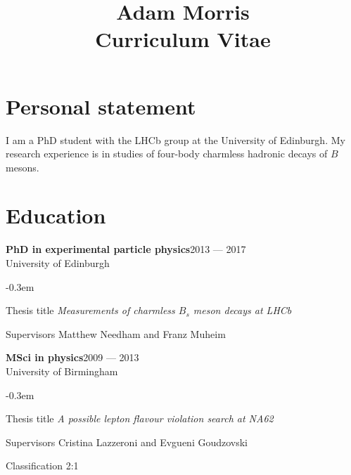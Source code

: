 \documentclass{simplecv}
\title{Adam Morris\\{\large Curriculum Vitae}}
\newcommand\dateditem[2]{#1\hfill#2\\}
\newcommand\topictitle[3]{\dateditem{{\textbf{#1}}}{#3}#2}
\def\typeface{phv}
\begin{document}
	\maketitle
	\fontfamily{\typeface}\selectfont
	\section{Personal statement}
	I am a PhD student with the LHCb group at the University of Edinburgh.
	My research experience is in studies of four-body charmless hadronic decays of $B$ mesons.
	\section{Education}
	\topictitle{PhD in experimental particle physics}{University of Edinburgh}{2013 --- 2017}
	\begin{topic}
		\itemsep-0.3em
		\item[Thesis title]{\textit{Measurements of charmless $B_s$ meson decays at LHCb}}
		\item[Supervisors]{Matthew Needham and Franz Muheim}
	\end{topic}
	\topictitle{MSci in physics}{University of Birmingham}{2009 --- 2013}
	\begin{topic}
		\itemsep-0.3em
		\item[Thesis title]{\textit{A possible lepton flavour violation search at NA62}}
		\item[Supervisors]{Cristina Lazzeroni and Evgueni Goudzovski}
		\item[Classification]{2:1}
	\end{topic}
\end{document}

